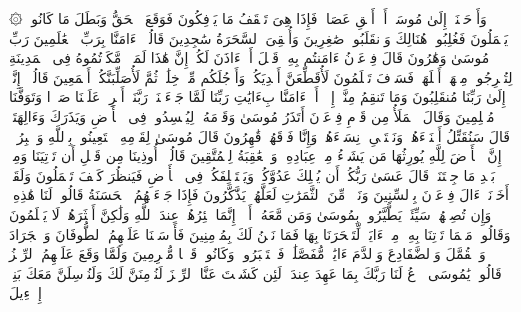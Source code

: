 ۞ وَأَوۡحَیۡنَاۤ إِلَىٰ مُوسَىٰۤ أَنۡ أَلۡقِ عَصَاكَۖ فَإِذَا هِیَ تَلۡقَفُ مَا یَأۡفِكُونَ%
\stopbuffer
\startbuffer[\q:7:118]
فَوَقَعَ ٱلۡحَقُّ وَبَطَلَ مَا كَانُوا۟ یَعۡمَلُونَ%
\stopbuffer
\startbuffer[\q:7:119]
فَغُلِبُوا۟ هُنَالِكَ وَٱنقَلَبُوا۟ صَٰغِرِینَ%
\stopbuffer
\startbuffer[\q:7:120]
وَأُلۡقِیَ ٱلسَّحَرَةُ سَٰجِدِینَ%
\stopbuffer
\startbuffer[\q:7:121]
قَالُوۤا۟ ءَامَنَّا بِرَبِّ ٱلۡعَٰلَمِینَ%
\stopbuffer
\startbuffer[\q:7:122]
رَبِّ مُوسَىٰ وَهَٰرُونَ%
\stopbuffer
\startbuffer[\q:7:123]
قَالَ فِرۡعَوۡنُ ءَامَنتُم بِهِۦ قَبۡلَ أَنۡ ءَاذَنَ لَكُمۡۖ إِنَّ هَٰذَا لَمَكۡرࣱ مَّكَرۡتُمُوهُ فِی ٱلۡمَدِینَةِ لِتُخۡرِجُوا۟ مِنۡهَاۤ أَهۡلَهَاۖ فَسَوۡفَ تَعۡلَمُونَ%
\stopbuffer
\startbuffer[\q:7:124]
لَأُقَطِّعَنَّ أَیۡدِیَكُمۡ وَأَرۡجُلَكُم مِّنۡ خِلَٰفࣲ ثُمَّ لَأُصَلِّبَنَّكُمۡ أَجۡمَعِینَ%
\stopbuffer
\startbuffer[\q:7:125]
قَالُوۤا۟ إِنَّاۤ إِلَىٰ رَبِّنَا مُنقَلِبُونَ%
\stopbuffer
\startbuffer[\q:7:126]
وَمَا تَنقِمُ مِنَّاۤ إِلَّاۤ أَنۡ ءَامَنَّا بِءَایَٰتِ رَبِّنَا لَمَّا جَاۤءَتۡنَاۚ رَبَّنَاۤ أَفۡرِغۡ عَلَیۡنَا صَبۡرࣰا وَتَوَفَّنَا مُسۡلِمِینَ%
\stopbuffer
\startbuffer[\q:7:127]
وَقَالَ ٱلۡمَلَأُ مِن قَوۡمِ فِرۡعَوۡنَ أَتَذَرُ مُوسَىٰ وَقَوۡمَهُۥ لِیُفۡسِدُوا۟ فِی ٱلۡأَرۡضِ وَیَذَرَكَ وَءَالِهَتَكَۚ قَالَ سَنُقَتِّلُ أَبۡنَاۤءَهُمۡ وَنَسۡتَحۡیِۦ نِسَاۤءَهُمۡ وَإِنَّا فَوۡقَهُمۡ قَٰهِرُونَ%
\stopbuffer
\startbuffer[\q:7:128]
قَالَ مُوسَىٰ لِقَوۡمِهِ ٱسۡتَعِینُوا۟ بِٱللَّهِ وَٱصۡبِرُوۤا۟ۖ إِنَّ ٱلۡأَرۡضَ لِلَّهِ یُورِثُهَا مَن یَشَاۤءُ مِنۡ عِبَادِهِۦۖ وَٱلۡعَٰقِبَةُ لِلۡمُتَّقِینَ%
\stopbuffer
\startbuffer[\q:7:129]
قَالُوۤا۟ أُوذِینَا مِن قَبۡلِ أَن تَأۡتِیَنَا وَمِنۢ بَعۡدِ مَا جِئۡتَنَاۚ قَالَ عَسَىٰ رَبُّكُمۡ أَن یُهۡلِكَ عَدُوَّكُمۡ وَیَسۡتَخۡلِفَكُمۡ فِی ٱلۡأَرۡضِ فَیَنظُرَ كَیۡفَ تَعۡمَلُونَ%
\stopbuffer
\startbuffer[\q:7:130]
وَلَقَدۡ أَخَذۡنَاۤ ءَالَ فِرۡعَوۡنَ بِٱلسِّنِینَ وَنَقۡصࣲ مِّنَ ٱلثَّمَرَٰتِ لَعَلَّهُمۡ یَذَّكَّرُونَ%
\stopbuffer
\startbuffer[\q:7:131]
فَإِذَا جَاۤءَتۡهُمُ ٱلۡحَسَنَةُ قَالُوا۟ لَنَا هَٰذِهِۦۖ وَإِن تُصِبۡهُمۡ سَیِّئَةࣱ یَطَّیَّرُوا۟ بِمُوسَىٰ وَمَن مَّعَهُۥۤۗ أَلَاۤ إِنَّمَا طَٰۤئِرُهُمۡ عِندَ ٱللَّهِ وَلَٰكِنَّ أَكۡثَرَهُمۡ لَا یَعۡلَمُونَ%
\stopbuffer
\startbuffer[\q:7:132]
وَقَالُوا۟ مَهۡمَا تَأۡتِنَا بِهِۦ مِنۡ ءَایَةࣲ لِّتَسۡحَرَنَا بِهَا فَمَا نَحۡنُ لَكَ بِمُؤۡمِنِینَ%
\stopbuffer
\startbuffer[\q:7:133]
فَأَرۡسَلۡنَا عَلَیۡهِمُ ٱلطُّوفَانَ وَٱلۡجَرَادَ وَٱلۡقُمَّلَ وَٱلضَّفَادِعَ وَٱلدَّمَ ءَایَٰتࣲ مُّفَصَّلَٰتࣲ فَٱسۡتَكۡبَرُوا۟ وَكَانُوا۟ قَوۡمࣰا مُّجۡرِمِینَ%
\stopbuffer
\startbuffer[\q:7:134]
وَلَمَّا وَقَعَ عَلَیۡهِمُ ٱلرِّجۡزُ قَالُوا۟ یَٰمُوسَى ٱدۡعُ لَنَا رَبَّكَ بِمَا عَهِدَ عِندَكَۖ لَئِن كَشَفۡتَ عَنَّا ٱلرِّجۡزَ لَنُؤۡمِنَنَّ لَكَ وَلَنُرۡسِلَنَّ مَعَكَ بَنِیۤ إِسۡرَٰۤءِیلَ%
